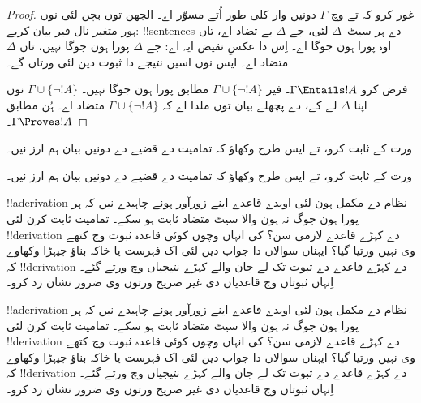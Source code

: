 \documentclass[../../../include/open-logic-section]{subfiles}
\begin{document}
\begin{proof}
غور کرو کہ  تے
 وچ $\Gamma$
دونیں وار کلی طور اُتے مسوّر اے۔ الجھن
توں بچن لئی 
نوں ہور متغیر نال فیر بیان کریے:
!!{sentence}s دے ہر سیٹ~$\Delta$
لئی، جے $\Delta$ بے تضاد اے، تاں
اوہ پورا ہون جوگا اے۔ اِس دا
عکسِ نقیض ایہ اے: جے $\Delta$
پورا ہون جوگا نہیں، تاں
$\Delta$ متضاد اے۔ ایس نوں اسیں
نتیجے دا ثبوت دین لئی ورتاں گے۔

فرض کرو $\Gamma \Entails !A$۔ فیر
$\Gamma \cup \{\lnot !A\}$
مطابق پورا ہون جوگا نہیں۔
$\Gamma \cup \{\lnot !A\}$
نوں اپنا $\Delta$ لے کے،
 دے پچھلے
بیان توں ملدا اے کہ
$\Gamma \cup \{\lnot !A\}$
متضاد اے۔ ہُن
مطابق $\Gamma \Proves !A$۔
\end{proof}

\begin{prob}
ورت کے 
ثابت کرو، تے ایس طرح وکھاؤ کہ تمامیت دے
قضیے دے دونیں بیان ہم ارز نیں۔
\end{prob}
\tagendprob

\begin{prob}
ورت کے 
ثابت کرو، تے ایس طرح وکھاؤ کہ تمامیت دے
قضیے دے دونیں بیان ہم ارز نیں۔
\end{prob}
\tagendprob

\begin{prob}
!!a{derivation} نظام دے مکمل ہون لئی
اوہدے قاعدے اینے زورآور ہونے چاہیدے نیں
کہ ہر پورا ہون جوگ نہ ہون والا سیٹ
متضاد ثابت ہو سکے۔ تمامیت ثابت کرن
لئی !!{derivation} دے کہڑے قاعدے
لازمی سن؟ کی انہاں وچوں کوئی قاعدہ
ثبوت وچ کتھے وی نہیں ورتیا گیا؟
ایہناں سوالاں دا جواب دین لئی اک فہرست
یا خاکہ بناؤ جیہڑا وکھاوے کہ
!!{derivation} دے کہڑے قاعدے
دے ثبوت تک لے جان والے کہڑے
نتیجیاں وچ ورتے گئے۔ اِنہاں ثبوتاں
وچ قاعدیاں دی غیر صریح ورتوں وی
ضرور نشان زد کرو۔
\end{prob}
\tagendprob

\begin{prob}
!!a{derivation} نظام دے مکمل ہون لئی
اوہدے قاعدے اینے زورآور ہونے چاہیدے نیں
کہ ہر پورا ہون جوگ نہ ہون والا سیٹ
متضاد ثابت ہو سکے۔ تمامیت ثابت کرن
لئی !!{derivation} دے کہڑے قاعدے
لازمی سن؟ کی انہاں وچوں کوئی قاعدہ
ثبوت وچ کتھے وی نہیں ورتیا گیا؟
ایہناں سوالاں دا جواب دین لئی اک فہرست
یا خاکہ بناؤ جیہڑا وکھاوے کہ
!!{derivation} دے کہڑے قاعدے
دے ثبوت تک لے جان والے کہڑے
نتیجیاں وچ ورتے گئے۔ اِنہاں ثبوتاں
وچ قاعدیاں دی غیر صریح ورتوں وی
ضرور نشان زد کرو۔
\end{prob}
\tagendprob
\end{document}
